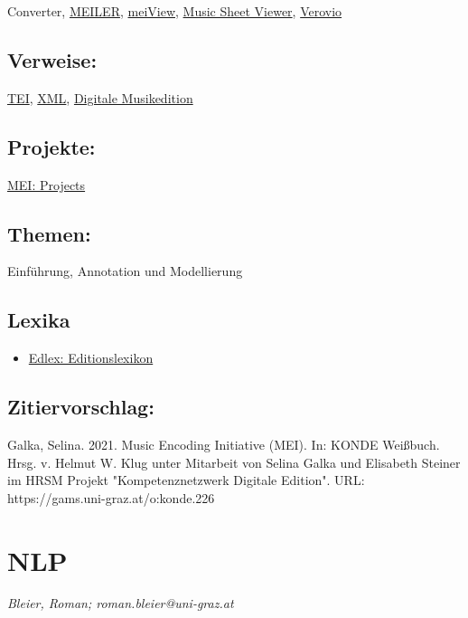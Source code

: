 \documentclass{article}
\begin{document}
{                           Converter}, \href{https://github.com/rettinghaus/MEILER}{MEILER}, \href{http://zolaemil.github.io/meiView/}{meiView}, \href{http://www.partitionnumerique.com/music-sheet-viewer-wordpress-plugin/}{Music Sheet Viewer}, \href{https://www.verovio.org/index.xhtml}{Verovio}\subsection*{Verweise:}\href{https://gams.uni-graz.at/o:konde.178}{TEI}, \href{https://gams.uni-graz.at/o:konde.215}{XML}, \href{https://gams.uni-graz.at/o:konde.139}{Digitale Musikedition}\subsection*{Projekte:}\href{https://music-encoding.org/community/projects-users.html}{MEI:
                           Projects}\subsection*{Themen:}Einführung, Annotation und Modellierung\subsection*{Lexika}\begin{itemize}\item \href{https://edlex.de/index.php?title=Music_Encoding_Initiative_(MEI)}{Edlex: Editionslexikon}\end{itemize}\subsection*{Zitiervorschlag:}Galka, Selina. 2021. Music Encoding Initiative (MEI). In: KONDE Weißbuch. Hrsg. v. Helmut W. Klug unter Mitarbeit von Selina Galka und Elisabeth Steiner im HRSM Projekt "Kompetenznetzwerk Digitale Edition". URL: https://gams.uni-graz.at/o:konde.226\newpage\section*{NLP} \emph{Bleier, Roman; roman.bleier@uni-graz.at}\\
        
\end{document}
